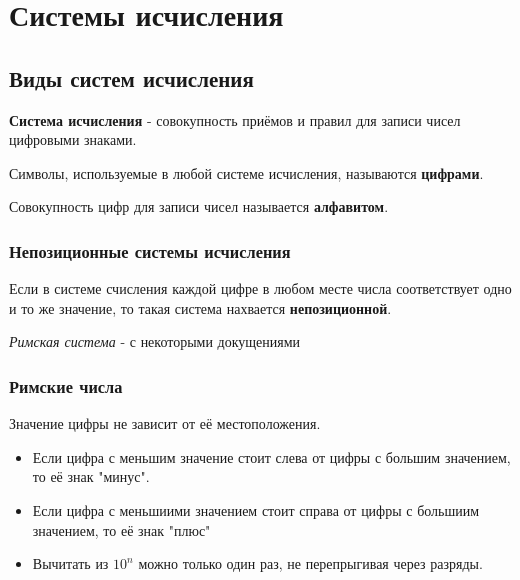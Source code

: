 \section{Системы исчисления}
\subsection{Виды систем исчисления}

\begin{definition}
  \textbf{Система исчисления} - совокупность приёмов и правил для записи чисел цифровыми знаками.
\end{definition}

\begin{definition}
  Символы, используемые в любой системе исчисления, называются \textbf{цифрами}.
\end{definition}

\begin{definition}
  Совокупность цифр для записи чисел называется \textbf{алфавитом}.
\end{definition}

\subsubsection{Непозиционные системы исчисления}

\begin{definition}
  Если в системе счисления каждой цифре в любом месте числа соответствует одно и то же значение, то такая система нахвается \textbf{непозиционной}.
\end{definition}
\begin{eg}
  \textit{Римская система} - с некоторыми докущениями 
\end{eg}

\subsubsection*{Римские числа}

Значение цифры не зависит от её местоположения.
\begin{itemize}
  \item Если цифра с меньшим значение стоит слева от цифры с большим значением, то её знак "минус".
  \item Если цифра с меньшиими значением стоит справа от цифры с большиим значением, то её знак "плюс"
  \item Вычитать из $10^n$ можно только один раз, не перепрыгивая через разряды.
\end{itemize}

